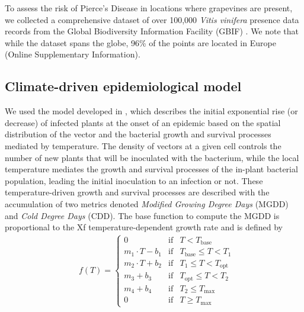 To assess the risk of Pierce's Disease in locations where grapevines are
present, we collected a comprehensive dataset of over 100,000 \textit{Vitis
    vinifera} presence data records from the Global Biodiversity Information
Facility (GBIF) \cite{noauthor_what_nodate,GBIF}. We note that while the
dataset spans the globe, 96\% of the points are located in Europe
(Online Supplementary Information).

\subsection{Climate-driven epidemiological model}

We used the model developed in \cite{GimenezRomero2022_CommsBio}, which
describes
the initial exponential rise (or decrease) of infected plants at the onset of
an epidemic based on the spatial distribution of the vector and the bacterial
growth and survival processes mediated by temperature. The density of vectors
at a given cell controls the number of new plants that will be inoculated with
the bacterium, while the local temperature mediates the growth and survival
processes of the in-plant bacterial population, leading the initial inoculation
to an infection or not. These temperature-driven growth and survival processes
are described with the accumulation of two metrics denoted \textit{Modified
    Growing Degree Days} (MGDD) and \textit{Cold Degree Days} (CDD). The base
function to compute the MGDD is proportional to the Xf temperature-dependent
growth rate and is defined by
\begin{align*}
     & f(T)=\left\{\begin{array}{lll}
                       0                & \textrm{if} & T<T_{\textrm{base}}
                       \\
                       m_1\cdot T-b_1   & \textrm{if} & T_{\textrm{base}} \leq
                       T < T_1
                       \\
                       m_2\cdot T + b_2 & \textrm{if} & T_{1} \leq T <
                       T_{\textrm{opt}}
                       \\
                       m_3 + b_3        & \textrm{if} & T_{\textrm{opt}} \leq T
                       < T_2
                       \\
                       m_4 + b_4        & \textrm{if} & T_2 \leq
                       T_{\textrm{max}}
                       \\
                       0                & \textrm{if} & T\geq T_{\textrm{max}}
                   \end{array}\right. \,
\end{align*}

